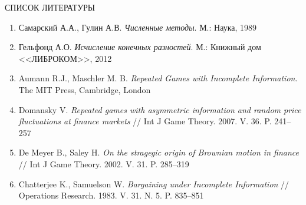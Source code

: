 \begin{center}
СПИСОК ЛИТЕРАТУРЫ
\end{center}

\begin{enumerate}
\item
Самарский А.А., Гулин А.В. \textit{Численные методы}. М.: Наука, 1989

\item
Гельфонд А.О. \textit{Исчисление конечных разностей}. М.: Книжный дом <<ЛИБРОКОМ>>, 2012

\item
Aumann R.J., Maschler M. B. \textit{Repeated Games with Incomplete Information}. The MIT Press, Cambridge, London

\item
Domansky V. \textit{Repeated games with asymmetric information and random price fluctuations at finance markets} // Int J Game Theory. 2007. V. 36. P. 241--257

\item
De Meyer B., Saley H. \textit{On the stragegic origin of Brownian motion in finance} // Int J Game Theory. 2002. V. 31. P. 285--319

\item
Chatterjee K., Samuelson W. \textit{Bargaining under Incomplete Information} // Operations Research. 1983. V. 31. N. 5. P. 835--851
\end{enumerate}

\makeenginfo